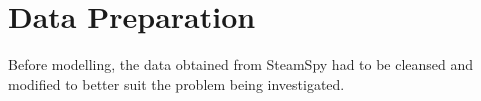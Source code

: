 \documentclass[preparation.tex]{subfiles}
\begin{document}
\section{Data Preparation} %
\label{sec:preparation}
Before modelling, the data obtained from SteamSpy had to be cleansed and
modified to better suit the problem being investigated.
\end{document}
